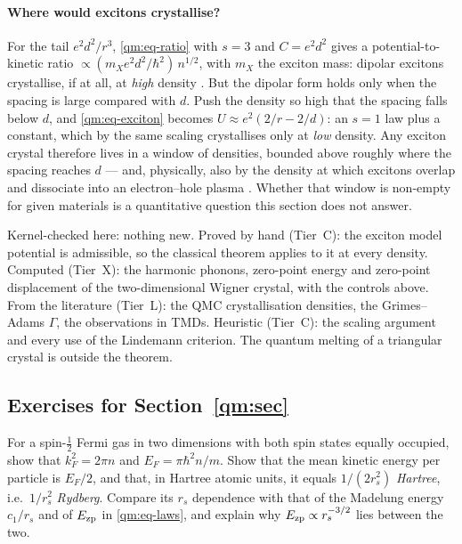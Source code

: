 \paragraph{Where would excitons crystallise?} For the tail $e^2d^2/r^3$, \eqref{qm:eq-ratio} with $s=3$ and
$C=e^2d^2$ gives a potential-to-kinetic ratio $\propto(m_Xe^2d^2/\hbar^2)\,n^{1/2}$, with $m_X$ the exciton mass:
dipolar excitons crystallise, if at all, at \emph{high} density \tierC. %
But the dipolar form holds only when the spacing is large compared with $d$. Push the density so high that the spacing
falls below $d$, and \eqref{qm:eq-exciton} becomes $U\approx e^2(2/r-2/d)$: an $s=1$ law plus a constant, which by
the same scaling crystallises only at \emph{low} density. Any exciton crystal therefore lives in a window of
densities, bounded above roughly where the spacing reaches $d$ --- and, physically, also by the density at which
excitons overlap and dissociate into an electron--hole plasma \tierC. Whether that window is non-empty for given
materials is a quantitative question this section does not answer.

\begin{warnbox}
Kernel-checked here: nothing new. Proved by hand (Tier~C): the exciton model potential is admissible, so the
classical theorem applies to it at every density. Computed (Tier~X): the harmonic phonons, zero-point energy and
zero-point displacement of the two-dimensional Wigner crystal, with the controls above. From the literature (Tier~L):
the QMC crystallisation densities, the Grimes--Adams $\Gamma$, the observations in TMDs. Heuristic (Tier~C): the
scaling argument and every use of the Lindemann criterion. The quantum melting of a triangular crystal is outside the
theorem.
\end{warnbox}

\subsection*{Exercises for Section~\ref{qm:sec}}

\begin{exercise}\label{qm:ex-fermi}
For a spin-$\frac12$ Fermi gas in two dimensions with both spin states equally occupied, show that $k_F^2=2\pi n$ and
$E_F=\pi\hbar^2n/m$. Show that the mean kinetic energy per particle is $E_F/2$, and that, in Hartree atomic units,
it equals $1/(2r_s^2)$ \emph{Hartree}, i.e.\ $1/r_s^2$ \emph{Rydberg}. Compare its $r_s$ dependence with that of the
Madelung energy $c_1/r_s$ and of $E_{\rm zp}$ in \eqref{qm:eq-laws}, and explain why $E_{\rm zp}\propto r_s^{-3/2}$
lies between the two.
\end{exercise}

